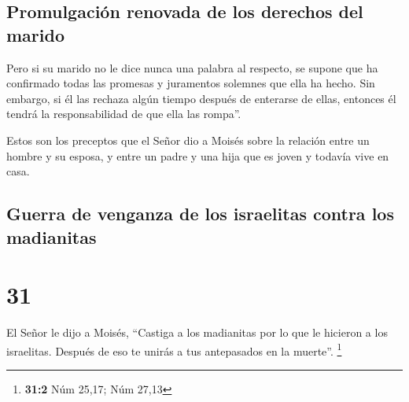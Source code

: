 \hypertarget{promulgaciuxf3n-renovada-de-los-derechos-del-marido}{%
\subsection{Promulgación renovada de los derechos del
marido}\label{promulgaciuxf3n-renovada-de-los-derechos-del-marido}}

 Pero si su marido no le dice nunca una palabra al
respecto, se supone que ha confirmado todas las promesas y juramentos
solemnes que ella ha hecho.  Sin embargo, si él las
rechaza algún tiempo después de enterarse de ellas, entonces él tendrá
la responsabilidad de que ella las rompa''.

 Estos son los preceptos que el Señor dio a Moisés sobre
la relación entre un hombre y su esposa, y entre un padre y una hija que
es joven y todavía vive en casa.

\hypertarget{guerra-de-venganza-de-los-israelitas-contra-los-madianitas}{%
\subsection{Guerra de venganza de los israelitas contra los
madianitas}\label{guerra-de-venganza-de-los-israelitas-contra-los-madianitas}}

\hypertarget{section-30}{%
\section{31}\label{section-30}}

 El Señor le dijo a Moisés,  ``Castiga a los
madianitas por lo que le hicieron a los israelitas. Después de eso te
unirás a tus antepasados en la muerte''. \footnote{\textbf{31:2} Núm
  25,17; Núm 27,13}

